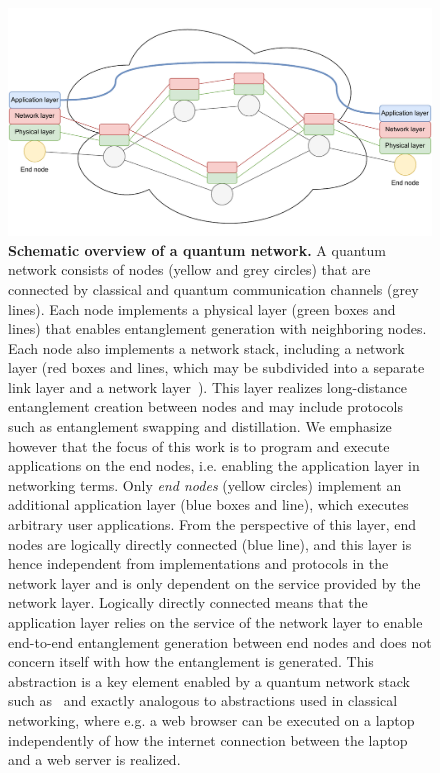 \begin{figure}[t]
    \centering
    \includegraphics[width=0.8\linewidth]{figures/background/network_nodes.pdf}
    \caption{
        \textbf{Schematic overview of a quantum network.}
        A quantum network consists of nodes (yellow and grey circles) that are connected by classical and quantum communication channels (grey lines).
        Each node implements a physical layer (green boxes and lines) that enables entanglement generation with neighboring nodes.
        Each node also implements a network stack, including a network layer (red boxes and lines, which may be subdivided into a separate link layer and a network layer~\cite{dahlberg_2019_egp, kozlowski_2019_towards}).
        This layer realizes long-distance entanglement creation between nodes and may include protocols such as entanglement swapping and distillation.
        \newline
        We emphasize however that the focus of this work is to program and execute applications on the end nodes, i.e. enabling the application layer in networking terms.
        Only \emph{end nodes} (yellow circles) implement an additional application layer (blue boxes and line), which executes arbitrary user applications.
        From the perspective of this layer, end nodes are logically directly connected (blue line), and this layer is hence independent from implementations and protocols in the network layer and is only dependent on the service  provided by the network layer.
        Logically directly connected means that the application layer relies on the service of the network layer to enable end-to-end entanglement generation between end nodes and does not concern itself with how the entanglement is generated.
        This abstraction is a key element enabled by a quantum network stack such as~\cite{dahlberg_2019_egp} and exactly analogous to abstractions used in classical networking, where e.g. a web browser can be executed on a laptop independently of how the internet connection between the laptop and a web server is realized.
    }
    \label{background:fig:network_model}
\end{figure}

